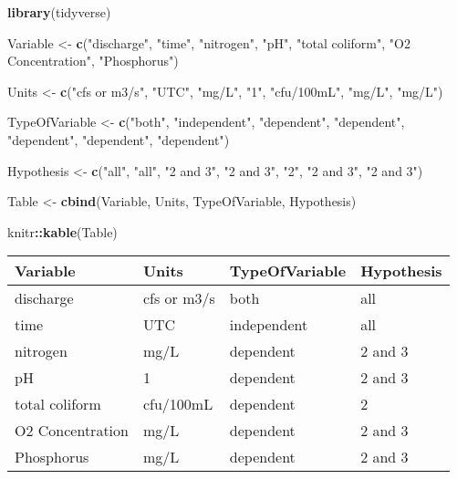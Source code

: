 \documentclass[]{article}
\newenvironment{Shaded}{\begin{snugshade}}{\end{snugshade}}
\newcommand{\KeywordTok}[1]{\textcolor[rgb]{0.13,0.29,0.53}{\textbf{#1}}}
\newcommand{\NormalTok}[1]{#1}
\newcommand{\OperatorTok}[1]{\textcolor[rgb]{0.81,0.36,0.00}{\textbf{#1}}}
\newcommand{\StringTok}[1]{\textcolor[rgb]{0.31,0.60,0.02}{#1}}
\begin{document}
\begin{Shaded}
\begin{Highlighting}[]
\KeywordTok{library}\NormalTok{(tidyverse)}

\NormalTok{Variable <-}\StringTok{ }\KeywordTok{c}\NormalTok{(}\StringTok{"discharge"}\NormalTok{, }\StringTok{"time"}\NormalTok{, }\StringTok{"nitrogen"}\NormalTok{, }\StringTok{"pH"}\NormalTok{, }\StringTok{"total coliform"}\NormalTok{, }
              \StringTok{"O2 Concentration"}\NormalTok{, }\StringTok{"Phosphorus"}\NormalTok{)}

\NormalTok{Units <-}\StringTok{ }\KeywordTok{c}\NormalTok{(}\StringTok{"cfs or m3/s"}\NormalTok{, }\StringTok{"UTC"}\NormalTok{, }\StringTok{"mg/L"}\NormalTok{, }\StringTok{"1"}\NormalTok{, }\StringTok{"cfu/100mL"}\NormalTok{, }\StringTok{"mg/L"}\NormalTok{, }\StringTok{"mg/L"}\NormalTok{)}

\NormalTok{TypeOfVariable <-}\StringTok{ }\KeywordTok{c}\NormalTok{(}\StringTok{"both"}\NormalTok{, }\StringTok{"independent"}\NormalTok{, }\StringTok{"dependent"}\NormalTok{, }\StringTok{"dependent"}\NormalTok{, }\StringTok{"dependent"}\NormalTok{, }
                    \StringTok{"dependent"}\NormalTok{, }\StringTok{"dependent"}\NormalTok{)}

\NormalTok{Hypothesis <-}\StringTok{ }\KeywordTok{c}\NormalTok{(}\StringTok{"all"}\NormalTok{, }\StringTok{"all"}\NormalTok{, }\StringTok{"2 and 3"}\NormalTok{, }\StringTok{"2 and 3"}\NormalTok{, }\StringTok{"2"}\NormalTok{, }\StringTok{"2 and 3"}\NormalTok{, }\StringTok{"2 and 3"}\NormalTok{)}

\NormalTok{Table <-}\StringTok{ }\KeywordTok{cbind}\NormalTok{(Variable, Units, TypeOfVariable, Hypothesis)}

\NormalTok{knitr}\OperatorTok{::}\KeywordTok{kable}\NormalTok{(Table)}
\end{Highlighting}
\end{Shaded}

\begin{longtable}[]{@{}llll@{}}
\toprule
Variable & Units & TypeOfVariable & Hypothesis\tabularnewline
\midrule
\endhead
discharge & cfs or m3/s & both & all\tabularnewline
time & UTC & independent & all\tabularnewline
nitrogen & mg/L & dependent & 2 and 3\tabularnewline
pH & 1 & dependent & 2 and 3\tabularnewline
total coliform & cfu/100mL & dependent & 2\tabularnewline
O2 Concentration & mg/L & dependent & 2 and 3\tabularnewline
Phosphorus & mg/L & dependent & 2 and 3\tabularnewline
\bottomrule
\end{longtable}
\end{document}

